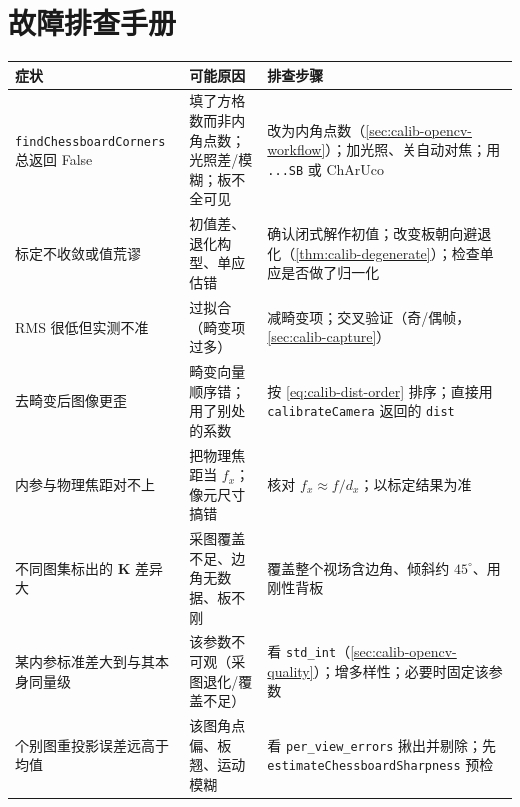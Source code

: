 \section*{故障排查手册}
\begin{table}[ht]\centering\small
\begin{tabular}{p{} p{} p{}}
\toprule
症状 & 可能原因 & 排查步骤 \\
\midrule
\texttt{findChessboardCorners} 总返回 False & 填了方格数而非内角点数；光照差/模糊；板不全可见 & 改为内角点数（\cref{sec:calib-opencv-workflow}）；加光照、关自动对焦；用 \texttt{...SB} 或 ChArUco \\
标定不收敛或值荒谬 & 初值差、退化构型、单应估错 & 确认闭式解作初值；改变板朝向避退化（\cref{thm:calib-degenerate}）；检查单应是否做了归一化 \\
RMS 很低但实测不准 & 过拟合（畸变项过多）& 减畸变项；交叉验证（奇/偶帧，\cref{sec:calib-capture}）\\
去畸变后图像更歪 & 畸变向量顺序错；用了别处的系数 & 按 \cref{eq:calib-dist-order} 排序；直接用 \texttt{calibrateCamera} 返回的 \texttt{dist} \\
内参与物理焦距对不上 & 把物理焦距当 $f_x$；像元尺寸搞错 & 核对 $f_x\approx f/d_x$；以标定结果为准 \\
不同图集标出的 $\mathbf{K}$ 差异大 & 采图覆盖不足、边角无数据、板不刚 & 覆盖整个视场含边角、倾斜约 $45^\circ$、用刚性背板 \\
某内参标准差大到与其本身同量级 & 该参数不可观（采图退化/覆盖不足）& 看 \texttt{std\_int}（\cref{sec:calib-opencv-quality}）；增多样性；必要时固定该参数 \\
个别图重投影误差远高于均值 & 该图角点偏、板翘、运动模糊 & 看 \texttt{per\_view\_errors} 揪出并剔除；先 \texttt{estimateChessboardSharpness} 预检 \\
\bottomrule
\end{tabular}
\end{table}

